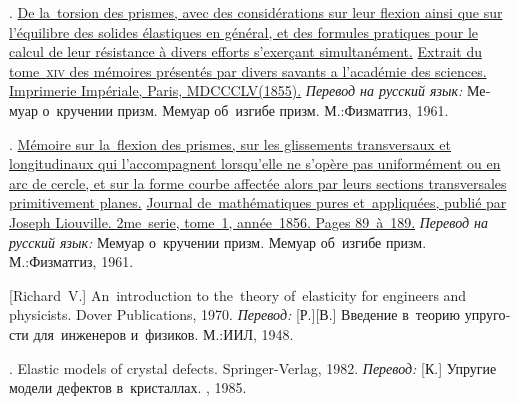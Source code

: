 \begin{thebibliography}{123}
\begin{otherlanguage}{russian}
.
%
\href{https://gallica.bnf.fr/ark:/12148/bpt6k99739z/}{De la~torsion des prismes, avec des considérations sur leur flexion ainsi que sur l’équilibre des solides élastiques en général, et des formules pratiques pour le calcul de leur résistance à divers efforts s’exerçant simultanément.}
%
\href{https://gallica.bnf.fr/ark:/12148/bpt6k99739z/}{Extrait du tome~\textsc{xiv} des mémoires présentés par divers savants a l’académie des sciences.
Imprimerie Impériale, Paris, M\:DCCC\:LV\:(1855).}
\emph{Перевод на русский язык:}
Мемуар о~кручении призм.
Мемуар об~изгибе призм.
М.:\;Физ\-мат\-гиз, 1961.

.
%
\href{http://www.numdam.org/item/JMPA_1856_2_1__89_0.pdf}{Mémoire sur la~flexion des prismes, sur les glissements transversaux et longitudinaux qui l’accompagnent lorsqu’elle ne s’opère pas uniformément ou en arc de cercle, et sur la forme courbe affectée alors par leurs sections transversales primitivement planes.}
%
\href{http://www.numdam.org/item/JMPA_1856_2_1__89_0.pdf}{Journal de~mathématiques pures et~appliquées, publié par Joseph Liouville.
2me~serie, tome~1, année~1856.
Pages 89~à~189.}
%
\emph{Перевод на русский язык:}
Мемуар о~кручении призм.
Мемуар об~изгибе призм.
М.:\;Физ\-мат\-гиз, 1961.

[Richard~V.]
An~introduction to the~theory of~elasticity for engineers and physicists.
Dover Publications, 1970.
\emph{Перевод:}
[Р.][В.]
Введение в~теорию упругости для~инженеров и~физиков.
М.:\;ИИЛ, 1948.

.
Elastic models of crystal defects.
Springer\hbox{-}Verlag,
1982.
\emph{Перевод:}
[К.]
Упругие модели дефектов в~кристаллах.
\mirpublisher,
1985.


\end{otherlanguage}
\end{thebibliography}
